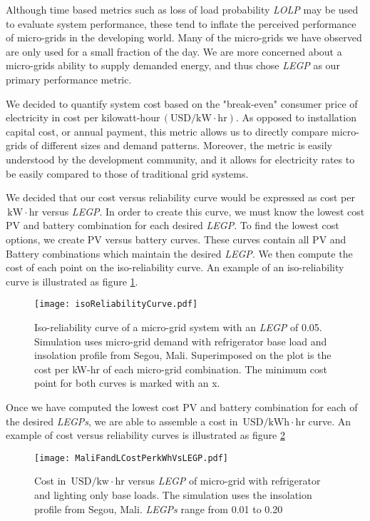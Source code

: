 \documentclass{article}
\newcommand{\unit}[1]{\ensuremath{\, \mathrm{#1}}}
\begin{document}
Although time based metrics such as loss of load probability \emph{LOLP} may be used to evaluate system performance, these tend to inflate the perceived performance of micro-grids in the developing world.
Many of the micro-grids we have observed are only used for a small fraction of the day.
We are more concerned about a micro-grids ability to supply demanded energy, and thus chose \emph{LEGP} as our primary performance metric.

We decided to quantify system cost based on the "break-even" consumer price of electricity in cost per kilowatt-hour\unit{(USD/kW\! \cdot \! hr)}.
As opposed to installation capital cost, or annual payment, this metric allows us to directly compare micro-grids of different sizes and demand patterns.
Moreover, the metric is easily understood by the development community, and it allows for electricity rates to be easily compared to those of traditional grid systems.
 
We decided that our cost versus reliability curve would be expressed as cost per \unit{kW \! \cdot \! hr} versus \emph{LEGP}.
In order to create this curve, we must know the lowest cost PV and battery combination for each desired \emph{LEGP}.
To find the lowest cost options, we create PV versus battery curves.
These curves contain all PV and Battery combinations which maintain the desired \emph{LEGP}. 
We then compute the cost of each point on the iso-reliability curve.
An example of an iso-reliability curve is illustrated as figure \ref{energyBalance}.
%
%
\begin{figure}[ht] 
  \centering
    \texttt{[image: isoReliabilityCurve.pdf]}
  \caption{Iso-reliability curve of a micro-grid system with an \emph{LEGP} of 0.05. 
Simulation uses micro-grid demand with refrigerator base load and insolation profile from Segou, Mali.
Superimposed on the plot is the cost per kW-hr of each micro-grid combination.
The minimum cost point for both curves is marked with an x.}
\label{energyBalance}
\end{figure}
%
%
Once we have computed the lowest cost PV and battery combination for each of the desired \emph{LEGPs}, we are able to assemble a cost in \unit{USD/kWh\! \cdot \!hr} curve. 
An example of cost versus reliability curves is illustrated as figure \ref{MaliFandLCostPerkWhVsLEGP}

\begin{figure}[ht] 
  \centering
    \texttt{[image: MaliFandLCostPerkWhVsLEGP.pdf]}
  \caption{Cost in \unit{USD/kw\! \cdot \! hr} versus \emph{LEGP} of 
micro-grid with refrigerator and lighting only base loads.
The simulation uses the insolation profile from Segou, Mali.
\emph{LEGPs} range from 0.01 to 0.20}
\label{MaliFandLCostPerkWhVsLEGP}
\end{figure}
\end{document}
